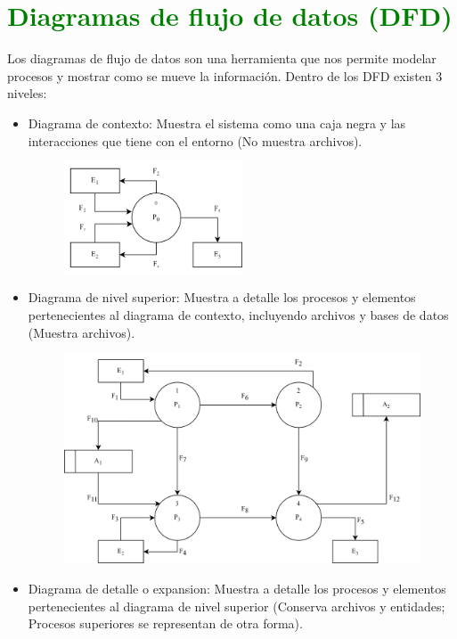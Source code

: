 \documentclass{templateNote}
\begin{document}
\section{\textcolor{green}{ Diagramas de flujo de datos (\textbf{DFD})}} 
\noindent Los diagramas de flujo de datos son una herramienta que nos permite modelar procesos y mostrar como se mueve la información. Dentro de los DFD existen 3 niveles:
\begin{itemize}
    \item Diagrama de contexto: Muestra el sistema como una caja negra y las interacciones que tiene con el entorno (No muestra archivos).
    \begin{figure}[H]
        \centering
        \includegraphics[width=0.5\textwidth]{img/contexto.png}
    \end{figure}
    \item Diagrama de nivel superior: Muestra a detalle los procesos y elementos pertenecientes al diagrama de contexto, incluyendo archivos y bases de datos (Muestra archivos).
    \begin{figure}[H]
        \centering
        \includegraphics[width=1\textwidth]{img/Superior.png}
    \end{figure}
    \item Diagrama de detalle o expansion: Muestra a detalle los procesos y elementos pertenecientes al diagrama de nivel superior (Conserva archivos y entidades; Procesos superiores se representan de otra forma).

\end{itemize}
\end{document}
